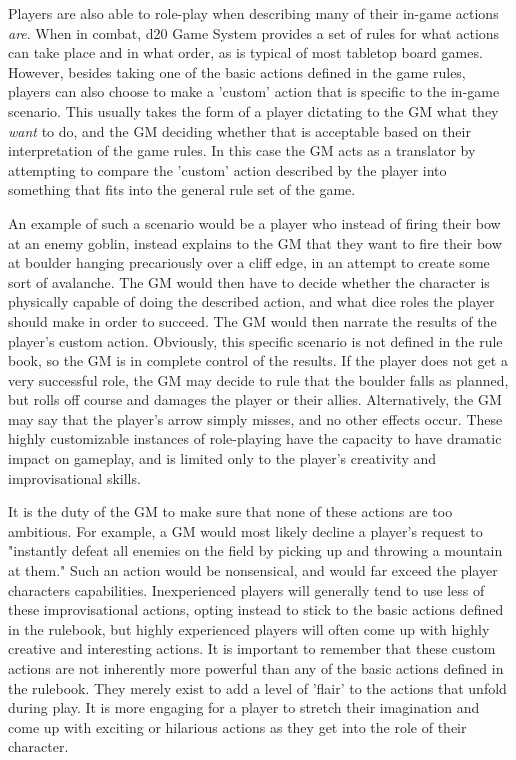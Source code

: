 \documentclass[12pt,a4paper]{report}
\begin{document}
		Players are also able to role-play when describing many of their in-game actions \textit{are}. When in combat, d20 Game System provides a set of rules for what actions can take place and in what order, as is typical of most tabletop board games. However, besides taking one of the basic actions defined in the game rules, players can also choose to make a 'custom' action that is specific to the in-game scenario. This usually takes the form of a player dictating to the GM what they \textit{want} to do, and the GM deciding whether that is acceptable based on their interpretation of the game rules. In this case the GM acts as a translator by attempting to compare the 'custom' action described by the player into something that fits into the general rule set of the game. 
		
		An example of such a scenario would be a player who instead of firing their bow at an enemy goblin, instead explains to the GM that they want to fire their bow at boulder hanging precariously over a cliff edge, in an attempt to create some sort of avalanche. The GM would then have to decide whether the character is physically capable of doing the described action, and what dice roles the player should make in order to succeed. The GM would then narrate the results of the player's custom action. Obviously, this specific scenario is not defined in the rule book, so the GM is in complete control of the results. If the player does not get a very successful role, the GM may decide to rule that the boulder falls as planned, but rolls off course and damages the player or their allies. Alternatively, the GM may say that the player's arrow simply misses, and no other effects occur. These highly customizable instances of role-playing have the capacity to have dramatic impact on gameplay, and is limited only to the player's creativity and improvisational skills. 
		
		It is the duty of the GM to make sure that none of these actions are too ambitious. For example, a GM would most likely decline a player's request to "instantly defeat all enemies on the field by picking up and throwing a mountain at them." Such an action would be nonsensical, and would far exceed the player characters capabilities. Inexperienced players will generally tend to use less of these improvisational actions, opting instead to stick to the basic actions defined in the rulebook, but highly experienced players will often come up with highly creative and interesting actions. It is important to remember that these custom actions are not inherently more powerful than any of the basic actions defined in the rulebook. They merely exist to add a level of 'flair' to the actions that unfold during play. It is more engaging for a player to stretch their imagination and come up with exciting or hilarious actions as they get into the role of their character. 
		
\end{document}
